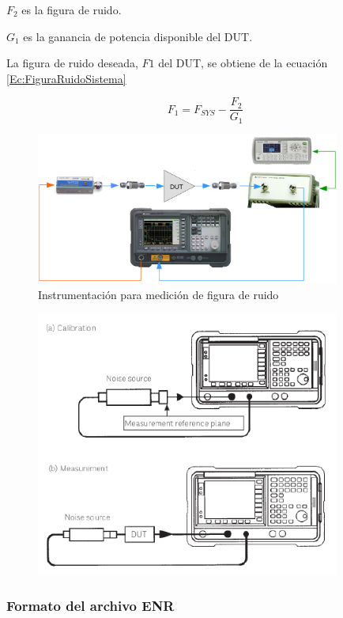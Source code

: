 \documentclass{article}
\begin{document}
	\noindent $F_2$ es la figura de ruido. 	
	
	\noindent $G_1$ es la ganancia de potencia disponible del DUT.
	
	La figura de ruido deseada, $F1$ del DUT, se obtiene de la ecuación \ref{Ec:FiguraRuidoSistema}
	
	\begin{equation}
		F_1 =  F_{SYS} - \frac{F_2}{G_1}
	\end{equation}	
	
	\begin{figure}[h!]
		\centering
		\includegraphics[width=10cm]{Imagenes/InstrumentacionMedicionFiguraRuido.pdf}
		\caption{Instrumentación para medición de figura de ruido}
		\label{Fig:InstrumentacionMedicionSMFR}		
	\end{figure}

	\begin{figure}[h!]
		\centering
		\includegraphics[width=10cm]{Imagenes/InstrumentacionCalibracionMedicion.pdf}
	\end{figure}

	\subsubsection{Formato del archivo ENR}
	
\end{document}
